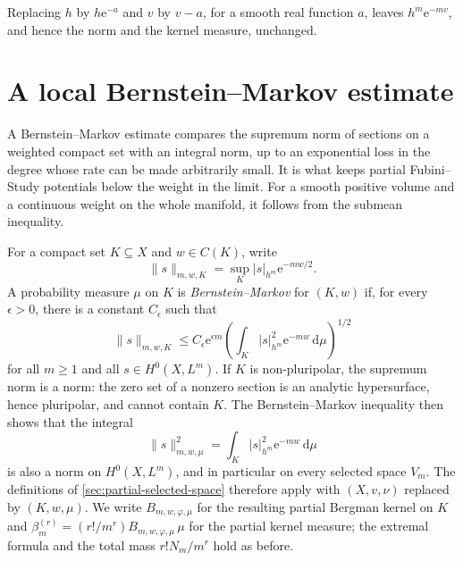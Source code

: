 Replacing $h$ by $h\mathrm{e}^{-a}$ and $v$ by $v-a$, for a smooth real function $a$, leaves $h^m\mathrm{e}^{-mv}$, and hence the norm and the kernel measure, unchanged.

\section{A local Bernstein--Markov estimate}
\label{sec:partial-bernstein-markov}

A Bernstein--Markov estimate compares the supremum norm of sections on a weighted compact set with an integral norm, up to an exponential loss in the degree whose rate can be made arbitrarily small. It is what keeps partial Fubini--Study potentials below the weight in the limit. For a smooth positive volume and a continuous weight on the whole manifold, it follows from the submean inequality.

For a compact set $K\subseteq X$ and $w\in C(K)$, write
\[
 \|s\|_{m,w,K}=\sup_K |s|_{h^m}\mathrm{e}^{-mw/2}.
\]
A probability measure $\mu$ on $K$ is \emph{Bernstein--Markov} for $(K,w)$ if, for every $\epsilon>0$, there is a constant $C_\epsilon$ such that
\[
 \|s\|_{m,w,K}\leq C_\epsilon \mathrm{e}^{\epsilon m}
          \left(\int_K|s|_{h^m}^2\mathrm{e}^{-mw}\,\mathrm{d}\mu\right)^{1/2}
\]
for all $m\geq1$ and all $s\in H^0(X,L^m)$. If $K$ is non-pluripolar, the supremum norm is a norm: the zero set of a nonzero section is an analytic hypersurface, hence pluripolar, and cannot contain $K$. The Bernstein--Markov inequality then shows that the integral
\[
 \|s\|_{m,w,\mu}^2=\int_K|s|_{h^m}^2\mathrm{e}^{-mw}\,\mathrm{d}\mu
\]
is also a norm on $H^0(X,L^m)$, and in particular on every selected space $V_m$. The definitions of \cref{sec:partial-selected-space} therefore apply with $(X,v,\nu)$ replaced by $(K,w,\mu)$. We write $B_{m,w,\varphi,\mu}$ for the resulting partial Bergman kernel on $K$ and $\beta_m^{(r)}=(r!/m^r)B_{m,w,\varphi,\mu}\,\mu$ for the partial kernel measure; the extremal formula and the total mass $r!N_m/m^r$ hold as before.

